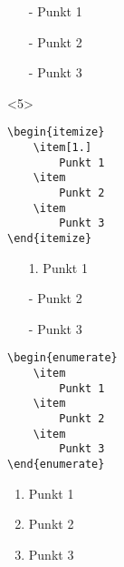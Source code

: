 \begin{frame}[fragile]
\begin{onlyenv}
		\Ausgabe
		\begin{outputbox}
			\begin{itemize}
				\item[-]
					Punkt 1
				\item[-]
					Punkt 2
				\item[-]
					Punkt 3
			\end{itemize}
		\end{outputbox}
	\end{onlyenv}
	\begin{onlyenv}
		\Code
		\begin{lstlisting}
\begin{itemize}
	\item[1.]
		Punkt 1
	\item
		Punkt 2
	\item
		Punkt 3
\end{itemize}
		\end{lstlisting}
		
		\Ausgabe
		\begin{outputbox}
			\begin{itemize}
				\item[1.]
					Punkt 1
				\item[-]
					Punkt 2
				\item[-]
					Punkt 3
			\end{itemize}
		\end{outputbox}
	\end{onlyenv}
\end{frame}
\begin{frame}[fragile]
	\Code
	\begin{lstlisting}
\begin{enumerate}
	\item
		Punkt 1
	\item
		Punkt 2
	\item
		Punkt 3
\end{enumerate}
	\end{lstlisting}
	
	\Ausgabe
	\begin{outputbox}
		\begin{enumerate}
			\item
				Punkt 1
			\item
				Punkt 2
			\item
				Punkt 3
		\end{enumerate}
	\end{outputbox}
\end{frame}
